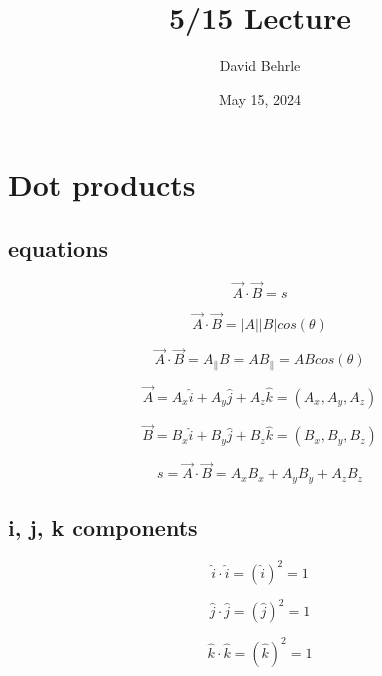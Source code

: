 \documentclass[a4paper]{article}
\title{5/15 Lecture}
\author{David Behrle}
\begin{document}
\date{May 15, 2024}
\maketitle
    \section{Dot products}
    \subsection{equations}
        \begin{equation}
            \vec{A} \cdot \vec{B} = s
        \end{equation}

        \begin{equation}
            \vec{A} \cdot \vec{B} = |A||B|cos(\theta)
        \end{equation}

        \begin{equation}
            \vec{A} \cdot \vec{B} = A_{\parallel}B = AB_{\parallel} = ABcos(\theta)
        \end{equation}

        \begin{equation}
            \vec{A} = A_x\hat{i} + A_y\hat{j} + A_z\hat{k} = (A_x, A_y, A_z)
        \end{equation}

        \begin{equation}
            \vec{B} = B_x\hat{i} + B_y\hat{j} + B_z\hat{k} = (B_x, B_y, B_z)
        \end{equation}

        \begin{equation}
            s = \vec{A} \cdot \vec{B} = A_xB_x + A_yB_y + A_zB_z
        \end{equation}
    \subsection{i, j, k components}
        \begin{equation}
            \hat{i} \cdot \hat{i} = (\hat{i})^2 = 1
        \end{equation}

        \begin{equation}
            \hat{j} \cdot \hat{j} = (\hat{j})^2 = 1
        \end{equation}

        \begin{equation}
            \hat{k} \cdot \hat{k} = (\hat{k})^2 = 1
        \end{equation}
\end{document}
